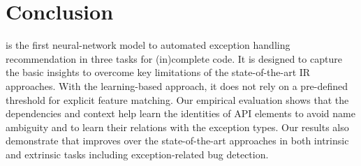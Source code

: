 \section{Conclusion}

{\tool} is the first neural-network model to automated exception
handling recommendation in three tasks for (in)complete code. It is
designed to capture the basic insights to overcome key limitations of
the state-of-the-art IR approaches. With the learning-based approach,
it does not rely on a pre-defined threshold for explicit feature
matching. Our empirical evaluation shows that the dependencies and
context help {\tool} learn the identities of API elements to avoid
name ambiguity and to learn their relations with the exception
types. Our results also demonstrate that {\tool} improves over the
state-of-the-art approaches in both intrinsic and extrinsic tasks
including exception-related bug detection.

